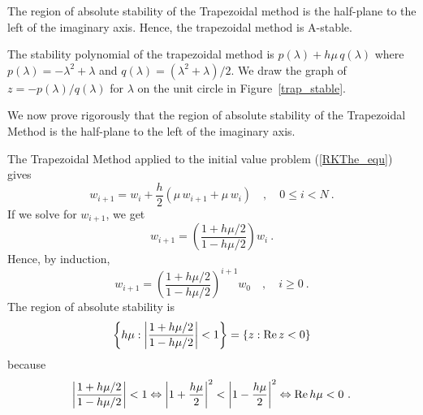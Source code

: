 
\begin{egg}
The region of absolute stability of the Trapezoidal method is the
half-plane to the left of the imaginary axis.  Hence, the trapezoidal
method is A-stable.

The stability polynomial of the trapezoidal method is
$p(\lambda) + h\mu\, q(\lambda)$ where
$p(\lambda) = -\lambda^2 + \lambda$ and
$q(\lambda) = (\lambda^2 + \lambda)/2$.
We draw the graph of $z = - p(\lambda)/q(\lambda)$ for $\lambda$ on
the unit circle in Figure~\ref{trap_stable}.

We now prove rigorously that the region of absolute stability of the
Trapezoidal Method is the half-plane to the left of the imaginary
axis.

The Trapezoidal Method applied to the initial value problem
(\ref{RKThe_equ}) gives
\[
w_{i+1} = w_i + \frac{h}{2}\left( \mu\, w_{i+1} + \mu\, w_i \right)
\quad , \quad 0 \leq i < N \ .
\]
If we solve for $w_{i+1}$, we get
\[
w_{i+1} = \left(\frac{1+h\mu/2}{1 - h\mu/2}\right) w_i \ .
\]
Hence, by induction,
\[
w_{i+1} = \left( \frac{1+h\mu/2}{1-h\mu/2} \right)^{i+1} w_0 \quad ,
\quad i \geq 0 \ .
\]
The region of absolute stability is
\[
\left\{ h\mu :
\bigg| \frac{1+h\mu/2}{1-h\mu/2} \bigg| <1 \right\} =
\left\{ z : \operatorname{Re} z < 0 \right\}
\]
because
\[
\bigg| \frac{1+h\mu/2}{1-h\mu/2} \bigg| <1 \Leftrightarrow
\bigg| 1+\frac{h\mu}{2} \bigg|^2 < \bigg| 1-\frac{h\mu}{2} \bigg|^2
\Leftrightarrow \operatorname{Re} h\mu < 0 \ .
\]
\end{egg}


